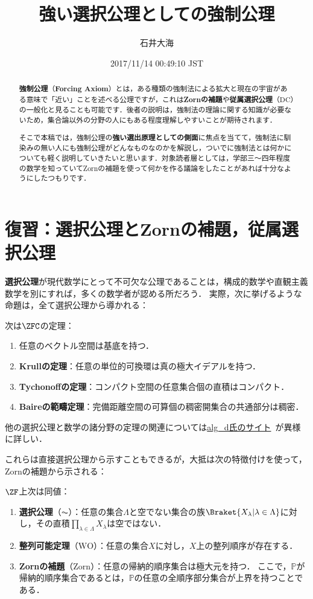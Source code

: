 \documentclass[a4j,leqno]{ltjsarticle}
\title{強い選択公理としての強制公理}
\author{石井大海}
\date{2017/11/14 00:49:10 JST}
\newcommand{\WO}{\mathrm{WO}}
\newcommand{\Zorn}{\mathrm{Zorn}}
\renewcommand{\emph}[1]{\textbf{\textsf{#1}}}
\begin{document}
\maketitle

\begin{abstract}
 \textbf{強制公理}（\emph{Forcing Axiom}）とは，ある種類の強制法による拡大と現在の宇宙がある意味で「近い」ことを述べる公理ですが，これは\textbf{Zornの補題}や\textbf{従属選択公理}（$\mathrm{DC}$）の一般化と見ることも可能です．後者の説明は，強制法の理論に関する知識が必要ないため，集合論以外の分野の人にもある程度理解しやすいことが期待されます．
 
  そこで本稿では，強制公理の\textbf{強い選出原理としての側面}に焦点を当てて，強制法に馴染みの無い人にも強制公理がどんなものなのかを解説し，ついでに強制法とは何かについても軽く説明していきたいと思います．対象読者層としては，学部三〜四年程度の数学を知っていてZornの補題を使って何かを作る議論をしたことがあれば十分なようにしたつもりです．
\end{abstract}

\section{復習：選択公理とZornの補題，従属選択公理}
\emph{選択公理}が現代数学にとって不可欠な公理であることは，構成的数学や直観主義数学を別にすれば，多くの数学者が認める所だろう．
実際，次に挙げるような命題は，全て選択公理から導かれる：
\begin{theorem}[ZFC]
 次は$\ZFC$の定理：
 \begin{enumerate}
  \item 任意のベクトル空間は基底を持つ．
  \item \emph{Krullの定理}：任意の単位的可換環は真の極大イデアルを持つ．
  \item \emph{Tychonoffの定理}：コンパクト空間の任意集合個の直積はコンパクト．
  \item \emph{Baireの範疇定理}：完備距離空間の可算個の稠密開集合の共通部分は稠密．
 \end{enumerate}
\end{theorem}
他の選択公理と数学の諸分野の定理の関連については\href{http://alg-d.com/math/ac/}{alg\_d氏のサイト}~\cite{alg-d}が異様に詳しい．

これらは直接選択公理から示すこともできるが，大抵は次の特徴付けを使って，Zornの補題から示される：
\begin{theorem}
 $\ZF$上次は同値：
 \begin{enumerate}
  \item \emph{選択公理}（$\AC$）：任意の集合$\Lambda$と空でない集合の族$\Braket{X_\lambda | \lambda \in \Lambda}$に対し，その直積$\prod_{\lambda \in \Lambda} X_\lambda$は空ではない．
  \item \emph{整列可能定理}（$\WO$）：任意の集合$X$に対し，$X$上の整列順序が存在する．
  \item \emph{Zornの補題}（$\Zorn$）：任意の帰納的順序集合は極大元を持つ．
        ここで，$\mathbb{P}$が帰納的順序集合であるとは，$\mathbb{P}$の任意の全順序部分集合が上界を持つことである．
 \end{enumerate}
\end{theorem}
\end{document}
